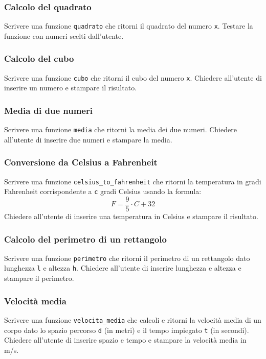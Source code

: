 \documentclass[a4paper,12pt]{article}
\begin{document}
	\subsubsection{Calcolo del quadrato}
	Scrivere una funzione \texttt{quadrato} che ritorni il quadrato del numero \texttt{x}.  
	Testare la funzione con numeri scelti dall'utente.
	
	\subsubsection{Calcolo del cubo}
	Scrivere una funzione \texttt{cubo} che ritorni il cubo del numero \texttt{x}.  
	Chiedere all'utente di inserire un numero e stampare il risultato.
	
	\subsubsection{Media di due numeri}
	Scrivere una funzione \texttt{media} che ritorni la media dei due numeri.  
	Chiedere all'utente di inserire due numeri e stampare la media.
	
	\subsubsection{Conversione da Celsius a Fahrenheit}
	Scrivere una funzione \texttt{celsius\_to\_fahrenheit} che ritorni la temperatura in gradi Fahrenheit corrispondente a \texttt{c} gradi Celsius usando la formula:  
	\[ F = \frac{9}{5} \cdot C + 32 \]  
	Chiedere all'utente di inserire una temperatura in Celsius e stampare il risultato.
	
	\subsubsection{Calcolo del perimetro di un rettangolo}
	Scrivere una funzione \texttt{perimetro} che ritorni il perimetro di un rettangolo dato lunghezza \texttt{l} e altezza \texttt{h}.  
	Chiedere all'utente di inserire lunghezza e altezza e stampare il perimetro.
	
	\subsubsection{Velocità media}
	Scrivere una funzione \texttt{velocita\_media} che calcoli e ritorni la velocità media di un corpo dato lo spazio percorso \texttt{d} (in metri) e il tempo impiegato \texttt{t} (in secondi).  
	Chiedere all'utente di inserire spazio e tempo e stampare la velocità media in m/s.
	
\end{document}

